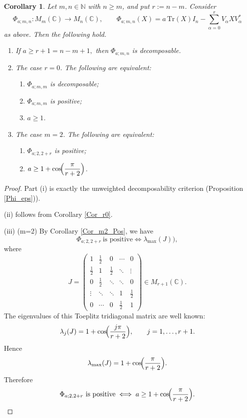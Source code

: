 \documentclass[12pt,a4paper]{amsart}
\theoremstyle{plain}
\newtheorem{corollary}[theorem]{Corollary}
\theoremstyle{remark}
\theoremstyle{definition}
\newcommand{\Tr}{{\textrm{Tr}}}
\begin{document}
\begin{corollary}%
	\rm 
	Let $m,n\in\mathbb N$ with $n\ge m$, and put $r:=n-m$. Consider
	\[
	\Phi_{a;m,n}:M_m(\mathbb C)\to M_n(\mathbb C),\qquad
	\Phi_{a;m,n}(X)=a\,\Tr(X)I_n-\sum_{\alpha=0}^{r}V_\alpha X V_\alpha^*
	\]
	as above. Then the following hold.
	\begin{enumerate}
		\item[(i)] %
		If $	a\ge r+1=n-m+1,$ 
		then $\Phi_{a;m,n}$ is decomposable.
		\item[(ii)] {The case $r=0$.}
		The following are equivalent:
		\begin{enumerate}
			\item[(a)] $\Phi_{a;m,m}$ is decomposable;
			\item[(b)] $\Phi_{a;m,m}$ is positive;
			\item[(c)] $a\ge 1$.
		\end{enumerate}
		\item[(iii)] {The case $m=2$.}
		The following are equivalent:
		\begin{enumerate}
			\item[(a)] $\Phi_{a;2,2+r}$ is positive;
			\item[(b)] $a\ge 1+\cos\!\Bigl(\dfrac{\pi}{r+2}\Bigr)$.
		\end{enumerate}
	\end{enumerate}
\end{corollary}

\begin{proof}
	Part (i) is exactly the unweighted decomposability criterion (Proposition \ref{Phi_eps})).%
	
	(ii) follows from Corollary \ref{Cor_r0}. 
	
	(iii) (m=2)
	By Corollary \ref{Cor_m2_Pos}, we have
	\[
	\Phi_{a;2,2+r}\ \text{is positive}
	\iff
	\lambda_{\max}\! (J)), 
	\]
	where
		\[
	J=
	\begin{pmatrix}
		1 & \frac12 & 0 & \cdots & 0\\
		\frac12 & 1 & \frac12 & \ddots & \vdots\\
		0 & \frac12 & \ddots & \ddots & 0\\
		\vdots & \ddots & \ddots & 1 & \frac12\\
		0 & \cdots & 0 & \frac12 & 1
	\end{pmatrix}
	\in M_{r+1}(\mathbb C).
	\]
	The eigenvalues of this Toeplitz tridiagonal matrix are well known:
	\[
	\lambda_j(J)=1+\cos\!\Bigl(\frac{j\pi}{r+2}\Bigr),
	\qquad j=1,\dots,r+1.
	\]
	Hence
	\[
	\lambda_{\max}(J)=1+\cos\!\Bigl(\frac{\pi}{r+2}\Bigr).
	\]
	Therefore
	\[
	\Phi_{a;2,2+r}\ \text{is positive}
	\iff
	a\ge 1+\cos\!\Bigl(\frac{\pi}{r+2}\Bigr).
	\]
\end{proof}
\end{document}
